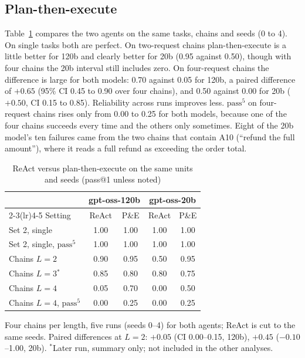 \documentclass[10pt,a4paper,twocolumn]{article}
\newcommand{\passk}[1]{\mathrm{pass}^{#1}}
\begin{document}
\subsection{Plan-then-execute}\label{sec:pe}
Table~\ref{tab:pe} compares the two agents on the same tasks, chains and seeds (0 to 4). On single tasks both are
perfect. On two-request chains plan-then-execute is a little better for 120b and clearly better for 20b (0.95 against
0.50), though with four chains the 20b interval still includes zero. On four-request chains the difference is large for
both models: 0.70 against 0.05 for 120b, a paired difference of $+0.65$ (95\% CI 0.45 to 0.90 over four chains), and
0.50 against 0.00 for 20b ($+0.50$, CI 0.15 to 0.85). Reliability across runs improves less. $\passk{5}$ on four-request
chains rises only from 0.00 to 0.25 for both models, because one of the four chains succeeds every time and the others
only sometimes. Eight of the 20b model's ten failures came from the two chains that contain A10 (``refund the full
amount''), where it reads a full refund as exceeding the order total.

\begin{table}[t]
\caption{ReAct versus plan-then-execute on the same units and seeds (pass@1 unless noted)}\label{tab:pe}
\centering\small
\setlength{\tabcolsep}{4pt}
\begin{tabular}{@{}lcccc@{}}
\toprule
 & \multicolumn{2}{c}{gpt-oss-120b} & \multicolumn{2}{c}{gpt-oss-20b}\\
\cmidrule(lr){2-3}\cmidrule(lr){4-5}
Setting & ReAct & P\&E & ReAct & P\&E\\
\midrule
Set 2, single & 1.00 & 1.00 & 1.00 & 1.00\\
Set 2, single, $\passk{5}$ & 1.00 & 1.00 & 1.00 & 1.00\\
Chains $L=2$ & 0.90 & 0.95 & 0.50 & 0.95\\
Chains $L=3$$^{\ast}$ & 0.85 & 0.80 & 0.80 & 0.75\\
Chains $L=4$ & 0.05 & 0.70 & 0.00 & 0.50\\
Chains $L=4$, $\passk{5}$ & 0.00 & 0.25 & 0.00 & 0.25\\
\bottomrule
\end{tabular}

\smallskip
\footnotesize Four chains per length, five runs (seeds 0--4) for both agents; ReAct is cut to the same seeds.
Paired differences at $L=2$: $+0.05$ (CI 0.00--0.15, 120b), $+0.45$ ($-0.10$--1.00, 20b).
$^{\ast}$Later run, summary only; not included in the other analyses.
\end{table}
\end{document}
